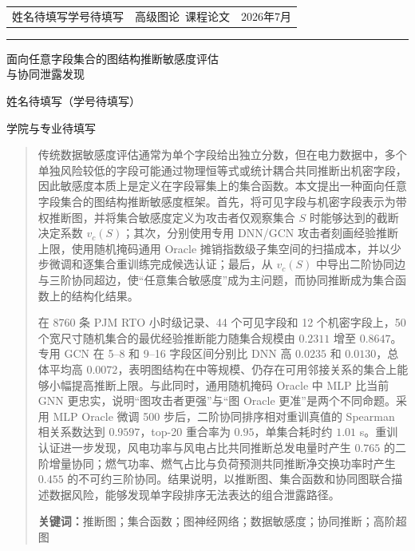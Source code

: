 \documentclass[UTF8,a4paper,zihao=5,fontset=fandol]{ctexart}
\newcommand{\CourseName}{高级图论}
\newcommand{\StudentName}{姓名待填写}
\newcommand{\StudentID}{学号待填写}
\newcommand{\Affiliation}{学院与专业待填写}
\begin{document}
\thispagestyle{empty}

\noindent
\begin{tabularx}{\textwidth}{@{}lXr@{}}
\small \StudentName\quad \StudentID & \centering\small \CourseName\ 课程论文 & \small 2026年7月\\
\end{tabularx}
\vspace{1.5mm}
\hrule height 0.8pt

\vspace{10mm}
\begin{center}
  {\heiti\color{titleblue}
  面向任意字段集合的图结构推断敏感度评估\\[2mm]
  与协同泄露发现\par}
  \vspace{5mm}
  {\fangsong \StudentName\quad（\StudentID）\par}
  \vspace{2mm}
  {\songti \Affiliation\par}
\end{center}

\vspace{6mm}
\begin{abstract}
传统数据敏感度评估通常为单个字段给出独立分数，但在电力数据中，多个单独风险较低的字段可能通过物理恒等式或统计耦合共同推断出机密字段，因此敏感度本质上是定义在字段幂集上的集合函数。本文提出一种面向任意字段集合的图结构推断敏感度框架。首先，将可见字段与机密字段表示为带权推断图，并将集合敏感度定义为攻击者仅观察集合 $S$ 时能够达到的截断决定系数 $v_c(S)$；其次，分别使用专用 DNN/GCN 攻击者刻画经验推断上限，使用随机掩码通用 Oracle 摊销指数级子集空间的扫描成本，并以少步微调和逐集合重训练完成候选认证；最后，从 $v_c(S)$ 中导出二阶协同边与三阶协同超边，使“任意集合敏感度”成为主问题，而协同推断成为集合函数上的结构化结果。

在 8760 条 PJM RTO 小时级记录、44 个可见字段和 12 个机密字段上，50 个宽尺寸随机集合的最优经验推断能力随集合规模由 $0.2311$ 增至 $0.8647$。专用 GCN 在 5--8 和 9--16 字段区间分别比 DNN 高 $0.0235$ 和 $0.0130$，总体平均高 $0.0072$，表明图结构在中等规模、仍存在可用邻接关系的集合上能够小幅提高推断上限。与此同时，通用随机掩码 Oracle 中 MLP 比当前 GNN 更忠实，说明“图攻击者更强”与“图 Oracle 更准”是两个不同命题。采用 MLP Oracle 微调 500 步后，二阶协同排序相对重训真值的 Spearman 相关系数达到 $0.9597$，top-20 重合率为 $0.95$，单集合耗时约 $1.01$ s。重训认证进一步发现，风电功率与风电占比共同推断总发电量时产生 $0.765$ 的二阶增量协同；燃气功率、燃气占比与负荷预测共同推断净交换功率时产生 $0.455$ 的不可约三阶协同。结果说明，以推断图、集合函数和协同图联合描述数据风险，能够发现单字段排序无法表达的组合泄露路径。

\noindent\textbf{关键词：}推断图；集合函数；图神经网络；数据敏感度；协同推断；高阶超图
\end{abstract}
\end{document}
